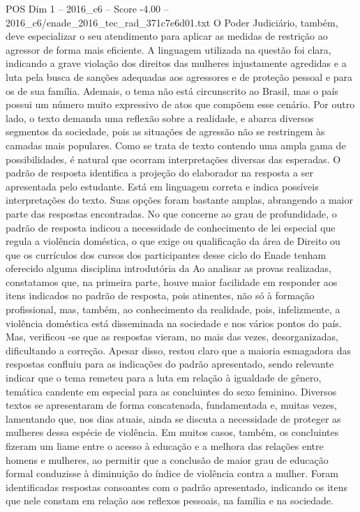 \begin{textsample}{POS Dim 1 – 2016\_c6 – Score -4.00 – 2016\_c6/enade\_2016\_tec\_rad\_371c7e6d01.txt}
O Poder Judiciário, também, deve especializar o seu atendimento para aplicar as medidas de restrição ao agressor de forma mais eficiente.
A linguagem utilizada na questão foi clara, indicando a grave violação dos direitos das mulheres injustamente agredidas e a luta pela busca de sanções adequadas aos agressores e de proteção pessoal e para os de sua família.
Ademais, o tema não está circunscrito ao Brasil, mas o país possui um número muito expressivo de atos que compõem esse cenário.
Por outro lado, o texto demanda uma reflexão sobre a realidade, e abarca diversos segmentos da sociedade, pois as situações de agressão não se restringem às camadas mais populares.
Como se trata de texto contendo uma ampla gama de possibilidades, é natural que ocorram interpretações diversas das esperadas.
O padrão de resposta identifica a projeção do elaborador na resposta a ser apresentada pelo estudante.
Está em linguagem correta e indica possíveis interpretações do texto.
Suas opções foram bastante amplas, abrangendo a maior parte das respostas encontradas.
No que concerne ao grau de profundidade, o padrão de resposta indicou a necessidade de conhecimento de lei especial que regula a violência doméstica, o que exige ou qualificação da área de Direito ou que os currículos dos cursos dos participantes desse ciclo do Enade tenham oferecido alguma disciplina introdutória da Ao analisar as provas realizadas, constatamos que, na primeira parte, houve maior facilidade em responder aos itens indicados no padrão de resposta, pois atinentes, não só à formação profissional, mas, também, ao conhecimento da realidade, pois, infelizmente, a violência doméstica está disseminada na sociedade e nos vários pontos do país.
Mas, verificou -se que as respostas vieram, no mais das vezes, desorganizadas, dificultando a correção.
Apesar disso, restou claro que a maioria esmagadora das respostas confluiu para as indicações do padrão apresentado, sendo relevante indicar que o tema remeteu para a luta em relação à igualdade de gênero, temática candente em especial para as concluintes do sexo feminino.
Diversos textos se apresentaram de forma concatenada, fundamentada e, muitas vezes, lamentando que, nos dias atuais, ainda se discuta a necessidade de proteger as mulheres dessa espécie de violência.
Em muitos casos, também, os concluintes fizeram um liame entre o acesso à educação e a melhora das relações entre homens e mulheres, ao permitir que a conclusão de maior grau de educação formal conduzisse à diminuição do índice de violência contra a mulher.
Foram identificadas respostas consoantes com o padrão apresentado, indicando os itens que nele constam em relação aos reflexos pessoais, na família e na sociedade.

\end{textsample}
